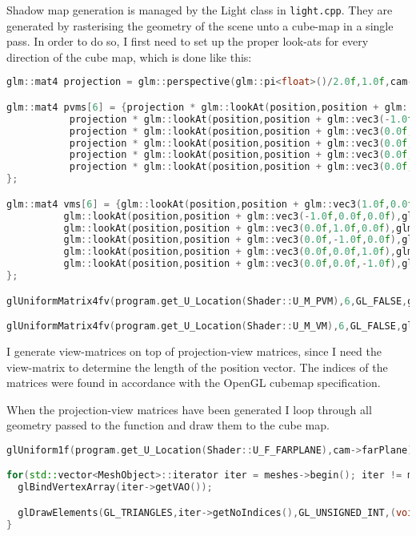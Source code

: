 Shadow map generation is managed by the Light class in \verb=light.cpp=. They are generated by rasterising the geometry of the scene unto a cube-map in a single pass. In order to do so, I first need to set up the proper look-ats for every direction of the cube map, which is done like this:
\begin{lstlisting}[caption={light.cpp},language=c++]
glm::mat4 projection = glm::perspective(glm::pi<float>()/2.0f,1.0f,cam->nearPlane,cam->farPlane);

glm::mat4 pvms[6] = {projection * glm::lookAt(position,position + glm::vec3(1.0f,0.0f,0.0f),glm::vec3(0.0f,-1.0f,0.0f)),
           projection * glm::lookAt(position,position + glm::vec3(-1.0f,0.0f,0.0f),glm::vec3(0.0f,-1.0f,0.0f)),
           projection * glm::lookAt(position,position + glm::vec3(0.0f,1.0f,0.0f),glm::vec3(0.0f,0.0f,1.0f)),
           projection * glm::lookAt(position,position + glm::vec3(0.0f,-1.0f,0.0f),glm::vec3(0.0f,0.0f,-1.0f)),
           projection * glm::lookAt(position,position + glm::vec3(0.0f,0.0f,1.0f),glm::vec3(0.0f,-1.0f,0.0f)),
           projection * glm::lookAt(position,position + glm::vec3(0.0f,0.0f,-1.0f),glm::vec3(0.0f,-1.0f,0.0f))
};

glm::mat4 vms[6] = {glm::lookAt(position,position + glm::vec3(1.0f,0.0f,0.0f),glm::vec3(0.0f,-1.0f,0.0f)),
          glm::lookAt(position,position + glm::vec3(-1.0f,0.0f,0.0f),glm::vec3(0.0f,-1.0f,0.0f)),
          glm::lookAt(position,position + glm::vec3(0.0f,1.0f,0.0f),glm::vec3(0.0f,0.0f,1.0f)),
          glm::lookAt(position,position + glm::vec3(0.0f,-1.0f,0.0f),glm::vec3(0.0f,0.0f,-1.0f)),
          glm::lookAt(position,position + glm::vec3(0.0f,0.0f,1.0f),glm::vec3(0.0f,-1.0f,0.0f)),
          glm::lookAt(position,position + glm::vec3(0.0f,0.0f,-1.0f),glm::vec3(0.0f,-1.0f,0.0f))
};

glUniformMatrix4fv(program.get_U_Location(Shader::U_M_PVM),6,GL_FALSE,glm::value_ptr(pvms[0]));

glUniformMatrix4fv(program.get_U_Location(Shader::U_M_VM),6,GL_FALSE,glm::value_ptr(vms[0]));
\end{lstlisting}
I generate view-matrices on top of projection-view matrices, since I need the view-matrix to determine the length of the position vector. The indices of the matrices were found in accordance with the OpenGL cubemap specification.

When the projection-view matrices have been generated I loop through all geometry passed to the function and draw them to the cube map.
\begin{lstlisting}[caption={light.cpp},language=c++]
glUniform1f(program.get_U_Location(Shader::U_F_FARPLANE),cam->farPlane);

for(std::vector<MeshObject>::iterator iter = meshes->begin(); iter != meshes->end();iter++) {
  glBindVertexArray(iter->getVAO());

  glDrawElements(GL_TRIANGLES,iter->getNoIndices(),GL_UNSIGNED_INT,(void*) 0);
}
\end{lstlisting}

